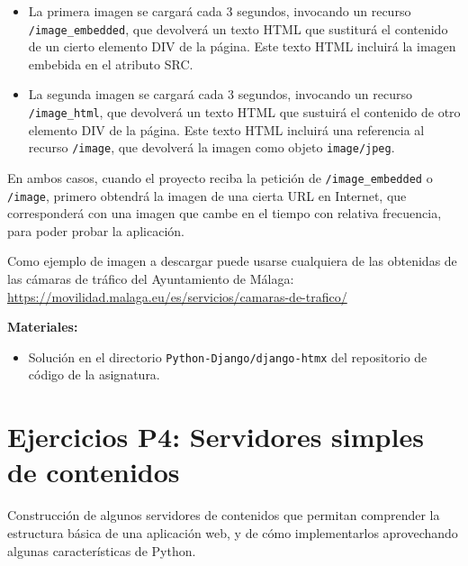 \begin{itemize}
\item La primera imagen se cargará cada 3 segundos, invocando un recurso \texttt{/image\_embedded}, que devolverá un texto HTML que sustiturá el contenido de un cierto elemento DIV de la página. Este texto HTML incluirá la imagen embebida en el atributo SRC.
\item La segunda imagen se cargará cada 3 segundos, invocando un recurso \texttt{/image\_html}, que devolverá un texto HTML que sustuirá el contenido de otro elemento DIV de la página. Este texto HTML incluirá una referencia al recurso \texttt{/image}, que devolverá la imagen como objeto \texttt{image/jpeg}.  
\end{itemize}

En ambos casos, cuando el proyecto reciba la petición de \texttt{/image\_embedded} o \texttt{/image}, primero obtendrá la imagen de una cierta URL en Internet, que corresponderá con una imagen que cambe en el tiempo con relativa frecuencia, para poder probar la aplicación.

Como ejemplo de imagen a descargar puede usarse cualquiera de las obtenidas de las cámaras de tráfico del Ayuntamiento de Málaga: \\
\url{https://movilidad.malaga.eu/es/servicios/camaras-de-trafico/}

\textbf{Materiales:}

\begin{itemize}
\item Solución en el directorio \texttt{Python-Django/django-htmx} del repositorio de código de la asignatura.
\end{itemize}

\section{Ejercicios P4: Servidores simples de contenidos}

Construcción de algunos servidores de contenidos que permitan comprender la estructura básica de una aplicación web, y de cómo implementarlos aprovechando algunas características de Python.

